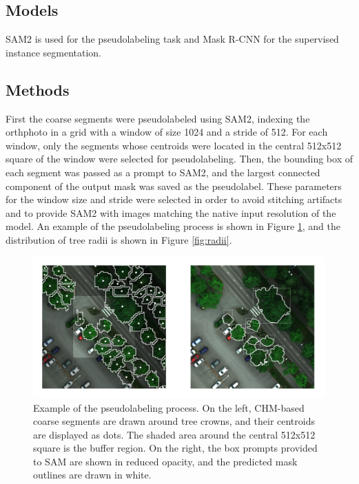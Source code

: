 \documentclass[english, 12pt, a4paper, sci, utf8, a-2b, online]{aaltothesis}
\begin{document}
\subsection{Models}

SAM2 is used for the pseudolabeling task and Mask R-CNN \cite{maskrcnn} for the supervised instance segmentation.

\subsection{Methods}

First the coarse segments were pseudolabeled using SAM2, indexing the orthphoto in a grid with a window of size 1024 and a stride of 512. For each window, only the segments whose centroids were located in the central 512x512 square of the window were selected for pseudolabeling. Then, the bounding box of each segment was passed as a prompt to SAM2, and the largest connected component of the output mask was saved as the pseudolabel. These parameters for the window size and stride were selected in order to avoid stitching artifacts and to provide SAM2 with images matching the native input resolution of the model. An example of the pseudolabeling process is shown in Figure \ref{fig:pseudolabel}, and the distribution of tree radii is shown in Figure \ref{fig:radii}.

\begin{figure}[h]
    \centering
    \includegraphics[width=1.0\textwidth]{figures/pseudolabel1.png}
    \caption{Example of the pseudolabeling process. On the left, CHM-based coarse segments are drawn around tree crowns, and their centroids are displayed as dots. The shaded area around the central 512x512 square is the buffer region. On the right, the box prompts provided to SAM are shown in reduced opacity, and the predicted mask outlines are drawn in white.}
    \label{fig:pseudolabel}
\end{figure}
\end{document}
